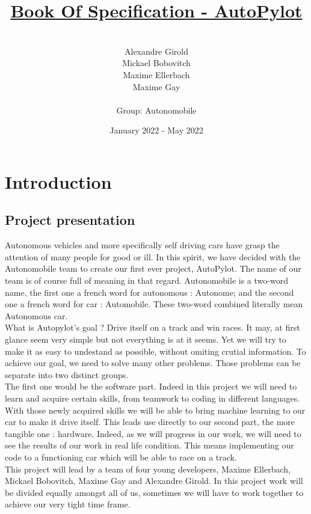 \documentclass[12pt]{article}
\title{\underline{Book Of Specification - AutoPylot}}
\date{January 2022 - May 2022}
\author{%
    \\
    Alexandre Girold\\
    Mickael Bobovitch \\
    Maxime Ellerbach \\
    Maxime Gay \\ \\
    Group: Autonomobile 
    }
\begin{document}
\maketitle
\newpage

\tableofcontents
\newpage

\section{Introduction}

\subsection{Project presentation}
Autonomous vehicles and more specifically self driving cars have grasp the attention of many people for good or ill. In this spirit, we have decided with the Autonomobile team to create our first ever project, AutoPylot. The name of our team is of course full of meaning in that regard. Autonomobile is a two-word name, the first one a french word for autonomous : Autonome; and the second one a french word for car : Automobile. These two-word combined literally mean Autonomous car.\\

What is Autopylot's goal ? 
Drive itself on a track and win races. It may, at first glance seem very simple but not everything is at it seems. Yet we will try to make it as easy to undestand as possible, without omiting crutial information. To achieve our goal, we need to solve many other problems. Those problems can be separate into two distinct groups. \\

The first one would be the software part. Indeed in this project we will need to learn and acquire certain skills, from teamwork to coding in different languages. With those newly acquired skills we will be able to bring machine learning to our car to make it drive itself. This leads use directly to our second part, the more tangible one : hardware. Indeed, as we will progress in our work, we will need to see the results of our work in real life condition. This means implementing our code to a functioning car which will be able to race on a track. \\

This project will lead by a team of four young developers, Maxime Ellerbach, Mickael Bobovitch, Maxime Gay and Alexandre Girold. In this project work will be divided equally amongst all of us, sometimes we will have to work together to achieve our very tight time frame. 
\end{document}
